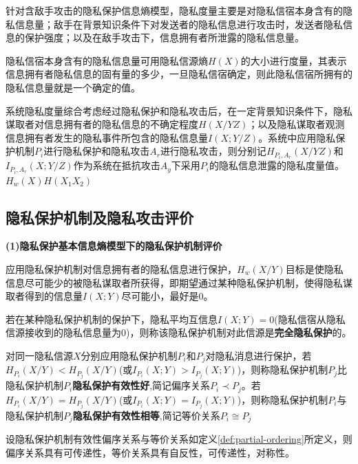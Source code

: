 针对含敌手攻击的隐私保护信息熵模型，隐私度量主要是对隐私信宿本身含有的隐私信息量；敌手在背景知识条件下对发送者的隐私信息进行攻击时，发送者隐私信息的保护强度；以及在敌手攻击下，信息拥有者所泄露的隐私信息量。

隐私信宿本身含有的隐私信息量可用隐私信源熵$H(X)$的大小进行度量，其表示信息拥有者隐私信息的固有量的多少，一旦隐私信宿确定，则此隐私信宿所拥有的隐私信息量就是一个确定的值。

系统隐私度量综合考虑经过隐私保护和隐私攻击后，在一定背景知识条件下，隐私谋取者对信息拥有者的隐私信息的不确定程度$H(X/YZ)$；以及隐私谋取者观测信息拥有者发生的隐私事件所包含的隐私信息量$I(X;Y/Z)$。系统中应用隐私保护机制$P_{i}$进行隐私保护和隐私攻击$A_{r}$进行隐私攻击，则分别记$H_{P_{i},A_{r}}(X/YZ)$和$I_{P_{i},A_{r}}(X;Y/Z)$作为系统在抵抗攻击$A_{y}$下采用$P_{i}$的隐私信息泄露的隐私度量值。$H_{w}(X)H(X_{1}X_{2})$

\subsection{隐私保护机制及隐私攻击评价}
\textbf{(1)隐私保护基本信息熵模型下的隐私保护机制评价}

应用隐私保护机制对信息拥有者的隐私信息进行保护，$H_{w}(X/Y)$目标是使隐私信息尽可能少的被隐私谋取者所获得，即期望通过某种隐私保护机制，使得隐私谋取者得到的信息量$I(X;Y)$尽可能小，最好是0。
\begin{definition}
	\label{def:perfec-privacy-preserving}
	若在某种隐私保护机制的保护下，隐私平均互信息$I(X;Y)=0$(隐私信宿从隐私信源接收到的隐私信息量为0)，则称该隐私保护机制对此信源是\textbf{完全隐私保护}的。
\end{definition}

\begin{definition}
\label{def:partial-ordering}	
	 对同一隐私信源$X$分别应用隐私保护机制$P_{i}$和$P_{j}$对隐私消息进行保护，若\\$H_{P_{i}}(X/Y)<H_{P_{j}}(X/Y)$(或$I_{P_{i}}(X;Y)>I_{P_{j}}(X;Y)$)，则称隐私保护机制$P_{j}$比隐私保护机制$P_{i}$\textbf{隐私保护有效性好},简记偏序关系$P_{i}\prec P_{j}$。若$H_{P_{i}}(X/Y)=H_{P_{j}}(X/Y)$(或$I_{P_{i}}(X;Y)=I_{P_{j}}(X;Y)$)，则称隐私保护机制$P_{i}$与隐私保护机制$P_{j}$\textbf{隐私保护有效性相等},简记等价关系$P_{i}\cong P_{j}$
\end{definition}

\begin{theorem}
	\label{thm:distance-properties}
	设隐私保护机制有效性偏序关系与等价关系如定义\ref{def:partial-ordering}所定义，则偏序关系具有可传递性，等价关系具有自反性，可传递性，对称性。
\end{theorem}

